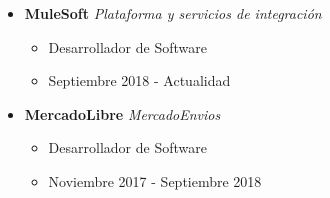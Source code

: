 \newcommand\job[4]{
    \item \textbf{#1} \textit{#2} 
        \begin{itemize}
            \item #3
            \item #4
        \end{itemize}
}
\begin{itemize}
    \job{MuleSoft}{Plataforma y servicios de integración}{Desarrollador de Software}{Septiembre 2018 - Actualidad}
    \job{MercadoLibre}{MercadoEnvios}{Desarrollador de Software}{Noviembre 2017 - Septiembre 2018}
\end{itemize}
